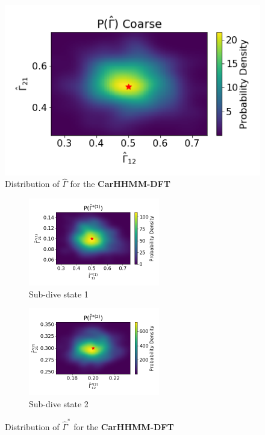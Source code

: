 \documentclass[12pt]{TD-CJS}
\begin{document}
\begin{figure}
    \centering
    \includegraphics[width=5in]{../Plots/hhmm_FV_Gamma_density_-1.png}
    \caption{Distribution of $\hat \Gamma$ for the \textbf{CarHHMM-DFT}}
\end{figure}

\begin{figure}[ht]
	\centering
	\begin{subfigure}[t]{0.45\textwidth}
        \centering
        \includegraphics[width=2.25in]{../Plots/hhmm_FV_Gamma_density_0.png}
        \caption{Sub-dive state 1}
    \end{subfigure}
    \begin{subfigure}[t]{0.45\textwidth}
        \centering
        \includegraphics[width=2.25in]{../Plots/hhmm_FV_Gamma_density_1.png}
        \caption{Sub-dive state 2}
    \end{subfigure}
    \caption{Distribution of $\hat \Gamma^{*}$ for the \textbf{CarHHMM-DFT}}
\end{figure}
\end{document}
